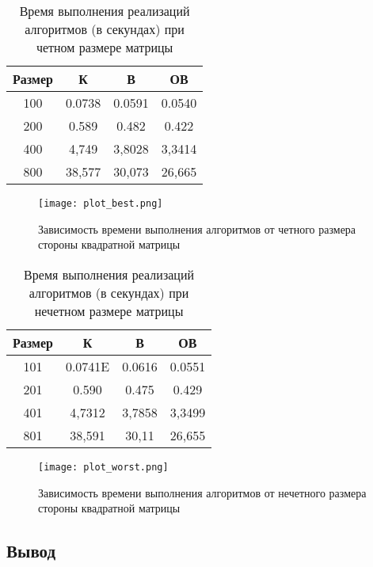 \begin{table}[ht]
    \caption{\centering Время выполнения реализаций алгоритмов (в секундах) при четном размере матрицы}
    \centering
    \begin{tabular}{|c|c|c|c|}
    \hline
    Размер & К      & В      & ОВ     \\ \hline
    100    & 0.0738 & 0.0591 & 0.0540 \\ \hline
    200    & 0.589  & 0.482  & 0.422  \\ \hline
    400    & 4,749  & 3,8028 & 3,3414 \\ \hline
    800    & 38,577 & 30,073 & 26,665 \\ \hline
    \end{tabular}
    \label{tab:time_best}
\end{table}

\begin{figure}
    \centering
    \texttt{[image: plot\_best.png]}
    \caption{Зависимость времени выполнения алгоритмов от четного размера стороны квадратной матрицы}
    \label{img:plot_best}
\end{figure}

\begin{table}[p]
    \caption{\centering Время выполнения реализаций алгоритмов (в секундах) при нечетном размере матрицы}
    \centering
    \begin{tabular}{|c|c|c|c|}
    \hline
    Размер & К       & В      & ОВ     \\ \hline
    101    & 0.0741E & 0.0616 & 0.0551 \\ \hline
    201    & 0.590   & 0.475  & 0.429  \\ \hline
    401    & 4,7312  & 3,7858 & 3,3499 \\ \hline
    801    & 38,591  & 30,11  & 26,655 \\ \hline
    \end{tabular}
    \label{tab:time_worst}
\end{table}

\begin{figure}
    \centering
    \texttt{[image: plot\_worst.png]}
    \caption{Зависимость времени выполнения алгоритмов от нечетного размера стороны квадратной матрицы}
    \label{img:plot_worst}
\end{figure}

\subsection{Вывод}

